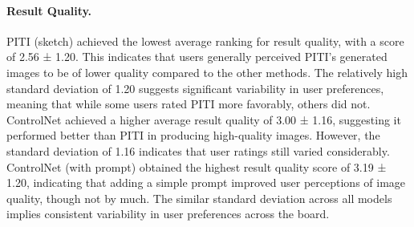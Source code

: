 \paragraph{Result Quality.}
PITI (sketch) achieved the lowest average ranking for result quality, with a score of 2.56 ± 1.20. This indicates that users generally perceived PITI's generated images to be of lower quality compared to the other methods. The relatively high standard deviation of 1.20 suggests significant variability in user preferences, meaning that while some users rated PITI more favorably, others did not. ControlNet achieved a higher average result quality of 3.00 ± 1.16, suggesting it performed better than PITI in producing high-quality images. However, the standard deviation of 1.16 indicates that user ratings still varied considerably. ControlNet (with prompt) obtained the highest result quality score of 3.19 ± 1.20, indicating that adding a simple prompt improved user perceptions of image quality, though not by much. The similar standard deviation across all models implies consistent variability in user preferences across the board.

